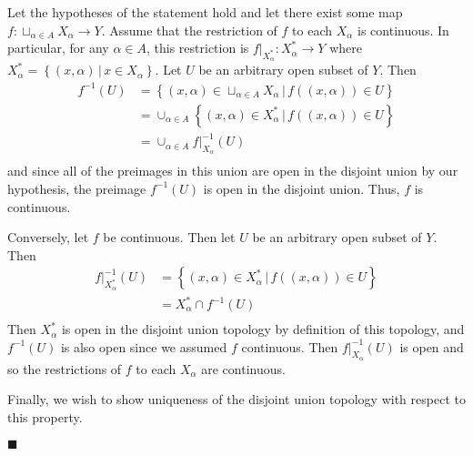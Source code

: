 \documentclass[12pt]{article}
\renewcommand{\qed}{\hfill$\blacksquare$}
\renewenvironment{proof}{\begin{addmargin}[1em]{0em}\begin{newproof}}{\end{newproof}\end{addmargin}\qed}
\begin{document}
\begin{proof}
Let the hypotheses of the statement hold and let there exist some map $f:\sqcup_{\alpha \in A} X_{\alpha}\rightarrow Y$. Assume that the restriction of $f$ to each $X_{\alpha}$ is continuous. In particular, for any $\alpha \in A$, this restriction is $f|_{X_{\alpha}^*}: X_{\alpha}^* \rightarrow Y$ where $X_{\alpha}^* = \left\{\left(x,\alpha\right)\, | \, x\in X_{\alpha}\right\}$. Let $U$ be an arbitrary open subset of $Y$. Then 
\begin{equation*}\begin{split}
f^{-1}\left(U\right) & = \left\{ \left(x,\alpha\right) \in \sqcup_{\alpha \in A} X_{\alpha} \, | \, f\left(\left(x,\alpha\right)\right) \in U\right\} \\
& = \cup_{\alpha \in A} \left\{ \left(x,\alpha\right) \in X_{\alpha}^* \, | \, f\left(\left(x,\alpha\right)\right) \in U \right\} \\
& = \cup_{\alpha \in A} f|_{X_{\alpha}}^{-1}\left(U\right) \\
\end{split}\end{equation*}
and since all of the preimages in this union are open in the disjoint union by our hypothesis, the preimage $f^{-1}\left(U\right)$ is open in the disjoint union. Thus, $f$ is continuous.

Conversely, let $f$ be continuous. Then let $U$ be an arbitrary open subset of $Y$. Then 
\begin{equation*}\begin{split}
f|_{X_{\alpha}^*}^{-1}\left(U\right) & = \left\{ \left(x,\alpha\right) \in X_{\alpha}^* \, | \, f\left(\left(x,\alpha\right)\right) \in U \right\} \\
& = X_{\alpha}^* \cap f^{-1}\left(U\right) \\
\end{split}\end{equation*} 
Then $X_{\alpha}^*$ is open in the disjoint union topology by definition of this topology, and $f^{-1}\left(U\right)$ is also open since we assumed $f$ continuous. Then $f|_{X_{\alpha}}^{-1}\left(U\right)$ is open and so the restrictions of $f$ to each $X_{\alpha}$ are continuous.

Finally, we wish to show uniqueness of the disjoint union topology with respect to this property.


\end{proof}
\end{document}
